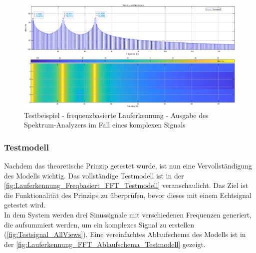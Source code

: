\begin{figure}
	\centering
	\includegraphics[width=\textwidth]{Bilder/frequenzbasierte_Lauferkennung_SpectrumAnalyzer_Ausgabe2_eps.eps}
	\caption{Testbeispiel - frequenzbasierte Lauferkennung - Ausgabe des Spektrum-Analyzers im Fall eines komplexen Signals}
	\label{fig:Lauferkennung_Freqbasiert_SpektrumAnalyzerAusgabe_gezoomt}
\end{figure}

%

\subsubsection{Testmodell}
Nachdem das theoretische  Prinzip getestet wurde, ist nun eine Vervollständigung des Modells wichtig. Das vollständige Testmodell ist in der \autoref{fig:Lauferkennung_Freqbasiert_FFT_Testmodell} veranschaulicht. Das Ziel ist die Funktionalität des Prinzips zu überprüfen, bevor dieses mit einem Echtsignal getestet wird.\\
In dem System werden drei Sinussignale mit verschiedenen Frequenzen generiert, die aufsummiert werden, um ein komplexes Signal zu erstellen (\autoref{fig:Testsignal_AllViews}).
Eine vereinfachtes Ablaufschema des Modells ist in der \autoref{fig:Lauferkennung_FFT_Ablaufschema_Testmodell} gezeigt.

